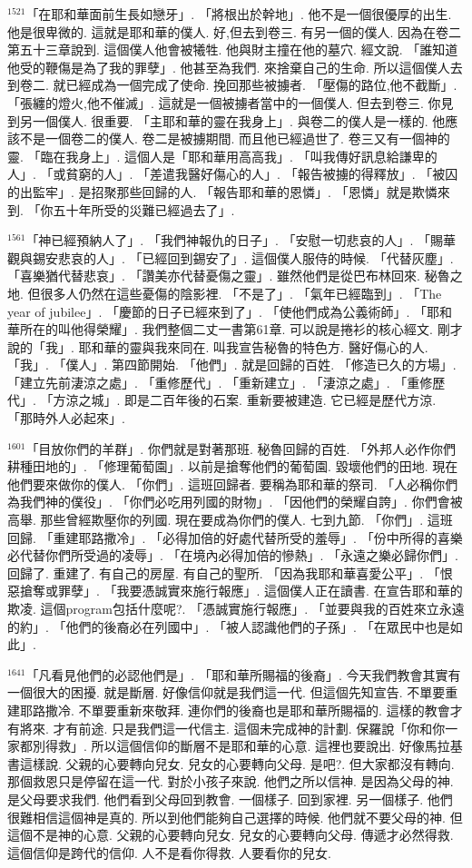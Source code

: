 \documentclass{book}
\begin{document}
$^{1521}$「在耶和華面前生長如戀牙」.
「將根出於幹地」.
他不是一個很優厚的出生.
他是很卑微的.
這就是耶和華的僕人.
好,但去到卷三.
有另一個的僕人.
因為在卷二第五十三章說到.
這個僕人他會被犧牲.
他與財主撞在他的墓穴.
經文說.
「誰知道他受的鞭傷是為了我的罪孽」.
他甚至為我們.
來捨棄自己的生命.
所以這個僕人去到卷二.
就已經成為一個完成了使命.
挽回那些被擄者.
「壓傷的路位,他不截斷」.
「張纏的燈火,他不催滅」.
這就是一個被擄者當中的一個僕人.
但去到卷三.
你見到另一個僕人.
很重要.
「主耶和華的靈在我身上」.
與卷二的僕人是一樣的.
他應該不是一個卷二的僕人.
卷二是被擄期間.
而且他已經過世了.
卷三又有一個神的靈.
「臨在我身上」.
這個人是「耶和華用高高我」.
「叫我傳好訊息給謙卑的人」.
「或貧窮的人」.
「差遣我醫好傷心的人」.
「報告被擄的得釋放」.
「被囚的出監牢」.
是招聚那些回歸的人.
「報告耶和華的恩憐」.
「恩憐」就是欺憐來到.
「你五十年所受的災難已經過去了」.

$^{1561}$「神已經預納人了」.
「我們神報仇的日子」.
「安慰一切悲哀的人」.
「賜華觀與錫安悲哀的人」.
「已經回到錫安了」.
這個僕人服侍的時候.
「代替灰塵」.
「喜樂猶代替悲哀」.
「讚美亦代替憂傷之靈」.
雖然他們是從巴布林回來.
秘魯之地.
但很多人仍然在這些憂傷的陰影裡.
「不是了」.
「氣年已經臨到」.
「The year of jubilee」.
「慶節的日子已經來到了」.
「使他們成為公義術師」.
「耶和華所在的叫他得榮耀」.
我們整個二丈一書第61章.
可以說是捲衫的核心經文.
剛才說的「我」.
耶和華的靈與我來同在.
叫我宣告秘魯的特色方.
醫好傷心的人.
「我」.
「僕人」.
第四節開始.
「他們」.
就是回歸的百姓.
「修造已久的方場」.
「建立先前淒涼之處」.
「重修歷代」.
「重新建立」.
「淒涼之處」.
「重修歷代」.
「方涼之城」.
即是二百年後的石案.
重新要被建造.
它已經是歷代方涼.
「那時外人必起來」.

$^{1601}$「目放你們的羊群」.
你們就是對著那班.
秘魯回歸的百姓.
「外邦人必作你們耕種田地的」.
「修理葡萄園」.
以前是搶奪他們的葡萄園.
毀壞他們的田地.
現在他們要來做你的僕人.
「你們」.
這班回歸者.
要稱為耶和華的祭司.
「人必稱你們為我們神的僕役」.
「你們必吃用列國的財物」.
「因他們的榮耀自誇」.
你們會被高舉.
那些曾經欺壓你的列國.
現在要成為你們的僕人.
七到九節.
「你們」.
這班回歸.
「重建耶路撒冷」.
「必得加倍的好處代替所受的羞辱」.
「份中所得的喜樂必代替你們所受過的凌辱」.
「在境內必得加倍的慘熱」.
「永遠之樂必歸你們」.
回歸了.
重建了.
有自己的房屋.
有自己的聖所.
「因為我耶和華喜愛公平」.
「恨惡搶奪或罪孽」.
「我要憑誠實來施行報應」.
這個僕人正在讀書.
在宣告耶和華的欺凌.
這個program包括什麼呢?.
「憑誠實施行報應」.
「並要與我的百姓來立永遠的約」.
「他們的後裔必在列國中」.
「被人認識他們的子孫」.
「在眾民中也是如此」.

$^{1641}$「凡看見他們的必認他們是」.
「耶和華所賜福的後裔」.
今天我們教會其實有一個很大的困擾.
就是斷層.
好像信仰就是我們這一代.
但這個先知宣告.
不單要重建耶路撒冷.
不單要重新來敬拜.
連你們的後裔也是耶和華所賜福的.
這樣的教會才有將來.
才有前途.
只是我們這一代信主.
這個未完成神的計劃.
保羅說「你和你一家都別得救」.
所以這個信仰的斷層不是耶和華的心意.
這裡也要說出.
好像馬拉基書這樣說.
父親的心要轉向兒女.
兒女的心要轉向父母.
是吧?.
但大家都沒有轉向.
那個救恩只是停留在這一代.
對於小孩子來說.
他們之所以信神.
是因為父母的神.
是父母要求我們.
他們看到父母回到教會.
一個樣子.
回到家裡.
另一個樣子.
他們很難相信這個神是真的.
所以到他們能夠自己選擇的時候.
他們就不要父母的神.
但這個不是神的心意.
父親的心要轉向兒女.
兒女的心要轉向父母.
傳遞才必然得救.
這個信仰是跨代的信仰.
人不是看你得救.
人要看你的兒女.
\end{document}
